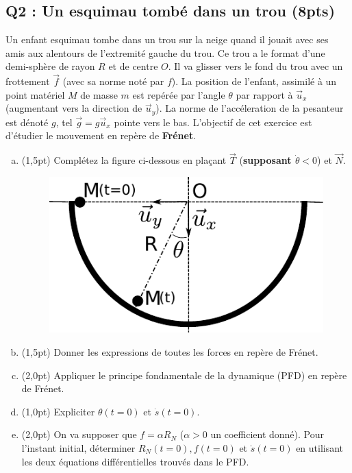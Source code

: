 \documentclass[french,10pt,twocolumn]{article}
\begin{document}
	\subsection*{Q2 : Un esquimau tombé dans un trou (8pts)} 
	Un enfant esquimau tombe dans un trou sur la neige quand il jouait avec ses amis aux alentours de l'extremité gauche du trou. Ce trou a le format d'une demi-sphère de rayon $R$ et de centre $O$. Il va glisser vers le fond du trou avec un frottement $\vec{f}$ (avec sa norme noté par $f$). La position de l'enfant, assimilé à un point matériel $M$ de masse $m$ est repérée par l’angle $\theta$ par rapport à $\vec{u}_x$ (augmentant vers la direction de $\vec{u}_y$). La norme de l'accéleration de la pesanteur est dénoté $g$, tel $\vec{g} = g\vec{u}_x$ pointe vers le bas. L'objectif de cet exercice est d'étudier le mouvement en repère de \textbf{Frénet}. 
	\begin{enumerate}[a)]
		\item(1,5pt) Complétez la figure ci-dessous en plaçant $\vec{T}$ (\textbf{supposant $\dot{\theta}<0$}) et $\vec{N}$.
		\begin{figure}[h!]
			\centering
			\includegraphics[width=0.5\linewidth]{trou}
		\end{figure}
		\item(1,5pt) Donner les expressions de toutes les forces en repère de Frénet.
		\item(2,0pt) Appliquer le principe fondamentale de la dynamique (PFD) en repère de Frénet.
		\item(1,0pt) Expliciter $\theta(t=0)$ et $\dot{s}(t=0)$.
		\item(2,0pt) On va supposer que $f = \alpha R_N$ ($\alpha >0$ un coefficient donné). Pour l'instant initial, déterminer $R_N(t=0), f(t=0)$ et $\ddot{s}(t=0)$ en utilisant les deux équations différentielles trouvés dans le PFD.
	\end{enumerate}
\end{document}
